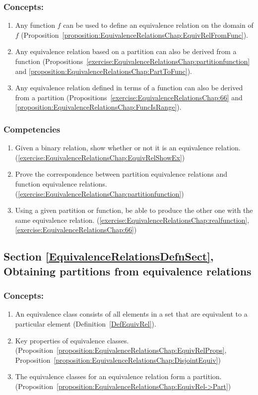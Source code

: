 \subsubsection*{Concepts:}
\begin{enumerate}
\item 
Any function $f$ can be used to define an equivalence relation on the domain of $f$ (Proposition~\ref{proposition:EquivalenceRelationsChap:EquivRelFromFunc}).
\item
Any equivalence relation based on a partition can also be derived from a function (Propositions~\ref{exercise:EquivalenceRelationsChap:partitionfunction} and \ref{proposition:EquivalenceRelationsChap:PartToFunc}).
\item
Any equivalence relation defined in terms of a function can also be derived from a partition (Propositions~\ref{exercise:EquivalenceRelationsChap:66} and \ref{proposition:EquivalenceRelationsChap:FuncIsRange}).

\end{enumerate}

\subsubsection*{Competencies}
\begin{enumerate}
\item
Given a binary relation, show whether or not it is an equivalence relation. (\ref{exercise:EquivalenceRelationsChap:EquivRelShowEx})
\item
Prove the correspondence between partition equivalence relations and function equivalence relations. (\ref{exercise:EquivalenceRelationsChap:partitionfunction})
\item
Using a given partition or function, be able to produce the other one with the same equivalence relation.  (\ref{exercise:EquivalenceRelationsChap:realfunction}, \ref{exercise:EquivalenceRelationsChap:66})
\end{enumerate}


\subsection*{Section \ref{EquivalenceRelationsDefnSect}, Obtaining partitions from equivalence relations}
\subsubsection*{Concepts:}
\begin{enumerate}
\item 
An equivalence class consists of all elements in a set that are equivalent to a particular element (Definition~\ref{DefEquivRel}).
\item
Key properties of equivalence classes.  (Proposition~\ref{proposition:EquivalenceRelationsChap:EquivRelProps}, Proposition~\ref{proposition:EquivalenceRelationsChap:DisjointEquiv})
\item
The equivalence classes for an equivalence relation  form a partition.   (Proposition~\ref{proposition:EquivalenceRelationsChap:EquivRel->Part})
\end{enumerate}

